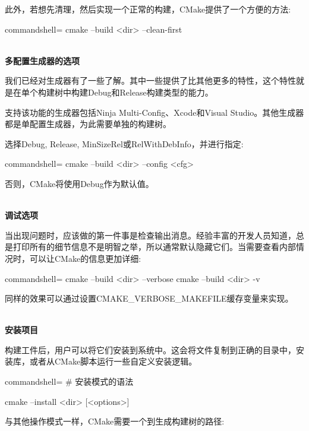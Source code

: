 此外，若想先清理，然后实现一个正常的构建，CMake提供了一个方便的方法:

\begin{tcblisting}{commandshell={}}
cmake --build <dir> --clean-first
\end{tcblisting}

\hspace*{\fill} \\ %
\noindent
\textbf{多配置生成器的选项}

我们已经对生成器有了一些了解。其中一些提供了比其他更多的特性，这个特性就是在单个构建树中构建Debug和Release构建类型的能力。

支持该功能的生成器包括Ninja Multi-Config、Xcode和Visual Studio。其他生成器都是单配置生成器，为此需要单独的构建树。

选择Debug, Release, MinSizeRel或RelWithDebInfo，并进行指定:

\begin{tcblisting}{commandshell={}}
cmake --build <dir> --config <cfg>
\end{tcblisting}

否则，CMake将使用Debug作为默认值。

\hspace*{\fill} \\ %
\noindent
\textbf{调试选项}

当出现问题时，应该做的第一件事是检查输出消息。经验丰富的开发人员知道，总是打印所有的细节信息不是明智之举，所以通常默认隐藏它们。当需要查看内部情况时，可以让CMake的信息更加详细:

\begin{tcblisting}{commandshell={}}
cmake --build <dir> --verbose
cmake --build <dir> -v
\end{tcblisting}

同样的效果可以通过设置CMAKE\_VERBOSE\_MAKEFILE缓存变量来实现。

\hspace*{\fill} \\ %
\noindent
\textbf{安装项目}

构建工件后，用户可以将它们安装到系统中。这会将文件复制到正确的目录中，安装库，或者从CMake脚本运行一些自定义安装逻辑。

\begin{tcblisting}{commandshell={}}
# 安装模式的语法

cmake --install <dir> [<options>]
\end{tcblisting}

与其他操作模式一样，CMake需要一个到生成构建树的路径:

